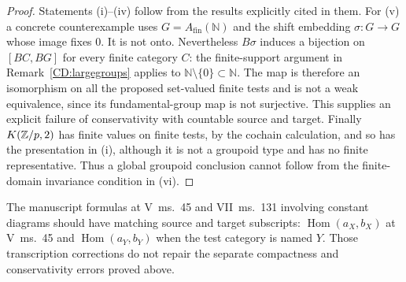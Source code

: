 \begin{proof}
Statements (i)--(iv) follow from the results explicitly cited in them.
For (v) a concrete counterexample uses
$G=A_{\mathrm{fin}}(\mathbb N)$ and the shift embedding
$\sigma:G\to G$ whose image fixes $0$.
It is not onto.  Nevertheless $B\sigma$ induces a bijection on
$[BC,BG]$ for every finite category $C$: the finite-support argument
in Remark~\ref{CD:largegroups} applies to
$\mathbb N\setminus\{0\}\subset\mathbb N$.
The map is therefore an isomorphism on all the proposed set-valued
finite tests and is not a weak equivalence, since its fundamental-group
map is not surjective.  This supplies an explicit failure of
conservativity with countable source and target.
Finally $K(\mathbb Z/p,2)$ has finite values on finite tests, by the
cochain calculation, and so has the presentation in (i), although it
is not a groupoid type and has no finite representative.  Thus a
global groupoid conclusion cannot follow from the finite-domain
invariance condition in (vi).
\end{proof}

The manuscript formulas at V~ms.~45 and VII~ms.~131 involving
constant diagrams should have matching source and target subscripts:
$\operatorname{Hom}(a_X,b_X)$ at V~ms.~45 and
$\operatorname{Hom}(a_Y,b_Y)$ when the test category is named $Y$.
Those transcription corrections do not repair the separate
compactness and conservativity errors proved above.

